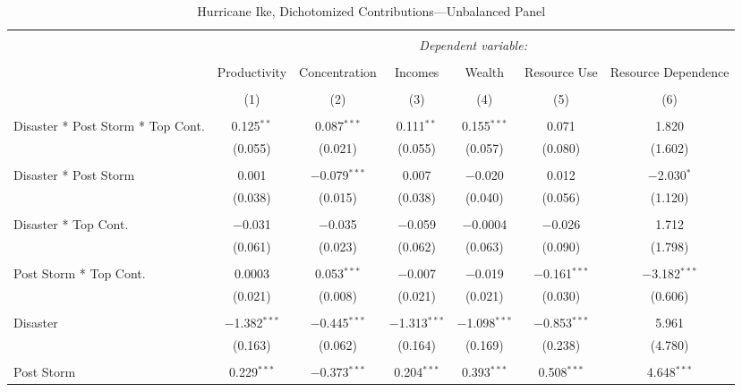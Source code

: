 
\begin{table}[!htbp] \centering 
  \caption{Hurricane Ike, Dichotomized Contributions---Unbalanced Panel} 
  \label{} 
\footnotesize 
\begin{tabular}{@{\extracolsep{5pt}}lcccccc} 
\\[-1.8ex]\hline 
\hline \\[-1.8ex] 
 & \multicolumn{6}{c}{\textit{Dependent variable:}} \\ 
\cline{2-7} 
\\[-1.8ex] & Productivity & Concentration & Incomes & Wealth & Resource Use & Resource Dependence \\ 
\\[-1.8ex] & (1) & (2) & (3) & (4) & (5) & (6)\\ 
\hline \\[-1.8ex] 
 Disaster * Post Storm * Top Cont. & 0.125$^{**}$ & 0.087$^{***}$ & 0.111$^{**}$ & 0.155$^{***}$ & 0.071 & 1.820 \\ 
  & (0.055) & (0.021) & (0.055) & (0.057) & (0.080) & (1.602) \\ 
  & & & & & & \\ 
 Disaster * Post Storm & 0.001 & $-$0.079$^{***}$ & 0.007 & $-$0.020 & 0.012 & $-$2.030$^{*}$ \\ 
  & (0.038) & (0.015) & (0.038) & (0.040) & (0.056) & (1.120) \\ 
  & & & & & & \\ 
 Disaster * Top Cont. & $-$0.031 & $-$0.035 & $-$0.059 & $-$0.0004 & $-$0.026 & 1.712 \\ 
  & (0.061) & (0.023) & (0.062) & (0.063) & (0.090) & (1.798) \\ 
  & & & & & & \\ 
 Post Storm *  Top Cont. & 0.0003 & 0.053$^{***}$ & $-$0.007 & $-$0.019 & $-$0.161$^{***}$ & $-$3.182$^{***}$ \\ 
  & (0.021) & (0.008) & (0.021) & (0.021) & (0.030) & (0.606) \\ 
  & & & & & & \\ 
 Disaster & $-$1.382$^{***}$ & $-$0.445$^{***}$ & $-$1.313$^{***}$ & $-$1.098$^{***}$ & $-$0.853$^{***}$ & 5.961 \\ 
  & (0.163) & (0.062) & (0.164) & (0.169) & (0.238) & (4.780) \\ 
  & & & & & & \\ 
 Post Storm & 0.229$^{***}$ & $-$0.373$^{***}$ & 0.204$^{***}$ & 0.393$^{***}$ & 0.508$^{***}$ & 4.648$^{***}$ \\ 

\end{tabular}
\end{table}
